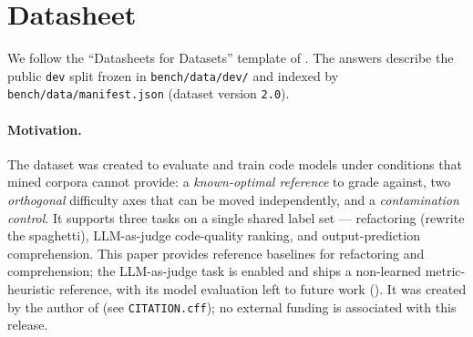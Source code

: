 
\section{Datasheet}
\label{app:datasheet}

We follow the ``Datasheets for Datasets'' template of \citet{gebru2021datasheets}.
The answers describe the public \texttt{dev} split frozen in \texttt{bench/data/dev/}
and indexed by \texttt{bench/data/manifest.json} (dataset version \texttt{2.0}).

\paragraph{Motivation.}
The dataset was created to evaluate and train code models under conditions that
mined corpora cannot provide: a \emph{known-optimal reference} to grade against,
two \emph{orthogonal} difficulty axes that can be moved independently, and a
\emph{contamination control}. It supports three tasks on a single shared label set
--- refactoring (rewrite the spaghetti), LLM-as-judge code-quality ranking, and
output-prediction comprehension. This paper provides reference baselines for
refactoring and comprehension; the LLM-as-judge task is enabled and ships a
non-learned metric-heuristic reference, with its model evaluation left to future
work (). It was created by the author of \tool{} (see
\texttt{CITATION.cff}); no external funding is associated with this release.

